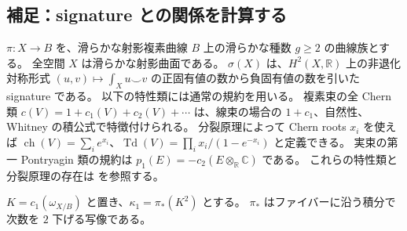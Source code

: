 \documentclass[dvipdfmx,a4paper,11pt]{article}
\theoremstyle{definition}
\newcommand{\C}{\mathbb C}\newcommand{\R}{\mathbb R}\newcommand{\Z}{\mathbb Z}\newcommand{\Q}{\mathbb Q}
\begin{document}
\subsection{補足：signature との関係を計算する}
$\pi:X\to B$ を、滑らかな射影複素曲線 $B$ 上の滑らかな種数 $g\ge2$ の曲線族とする。
全空間 $X$ は滑らかな射影曲面である。
$\sigma(X)$ は、$H^2(X,\R)$ 上の非退化対称形式
$(u,v)\mapsto\int_Xu\smile v$ の正固有値の数から負固有値の数を引いた signature である。
以下の特性類には通常の規約を用いる。
複素束の全 Chern 類 $c(V)=1+c_1(V)+c_2(V)+\cdots$ は、線束の場合の $1+c_1$、自然性、Whitney の積公式で特徴付けられる。
分裂原理によって Chern roots $x_i$ を使えば $\operatorname{ch}(V)=\sum_i e^{x_i}$、$\operatorname{Td}(V)=\prod_i x_i/(1-e^{-x_i})$ と定義できる。
実束の第一 Pontryagin 類の規約は $p_1(E)=-c_2(E\otimes_\R\C)$ である。
これらの特性類と分裂原理の存在は \cite{MS} を参照する。

$K=c_1(\omega_{X/B})$ と置き、$\kappa_1=\pi_*(K^2)$ とする。
$\pi_*$ はファイバーに沿う積分で次数を $2$ 下げる写像である。
\end{document}
